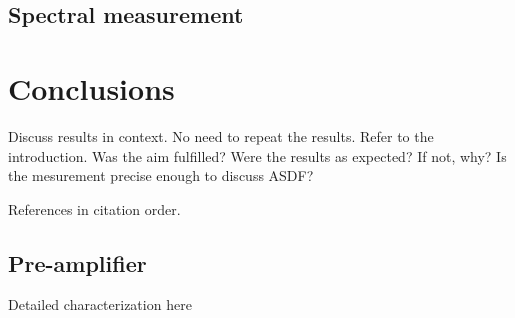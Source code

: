 \subsection{Spectral measurement}


\section{Conclusions}
Discuss results in context.
No need to repeat the results.
Refer to the introduction.
Was the aim fulfilled?
Were the results as expected? If not, why?
Is the mesurement precise enough to discuss ASDF?


References in citation order.
\printbibliography

\begin{appendices}

\section{Pre-amplifier}
Detailed characterization here

\end{appendices}


